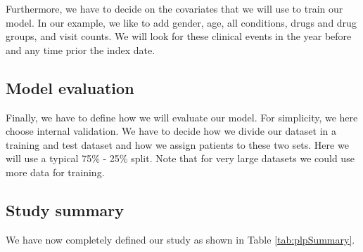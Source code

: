 \documentclass[11pt]{book}
\theoremstyle{definition}
\theoremstyle{definition}
\theoremstyle{definition}
\theoremstyle{remark}
\begin{document}
Furthermore, we have to decide on the covariates that we will use to train our model. In our example, we like to add gender, age, all conditions, drugs and drug groups, and visit counts. We will look for these clinical events in the year before and any time prior the index date.

\hypertarget{model-evaluation}{%
\subsection{Model evaluation}\label{model-evaluation}}

Finally, we have to define how we will evaluate our model. For simplicity, we here choose internal validation. We have to decide how we divide our dataset in a training and test dataset and how we assign patients to these two sets. Here we will use a typical 75\% - 25\% split. Note that for very large datasets we could use more data for training.

\hypertarget{study-summary-1}{%
\subsection{Study summary}\label{study-summary-1}}

We have now completely defined our study as shown in Table \ref{tab:plpSummary}.
\end{document}
